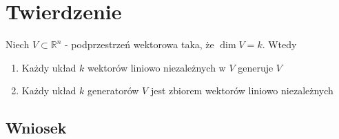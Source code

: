 \documentclass[11pt]{article}
\begin{document}
\section{Twierdzenie}
Niech $V \subset \mathbb{R}^n$ - podprzestrzeń wektorowa taka, że $\dim{V}=k$. Wtedy
\begin{enumerate}
\item{Każdy układ $k$ wektorów liniowo niezależnych w $V$ generuje $V$}
\item{Każdy układ $k$ generatorów $V$ jest zbiorem wektorów liniowo niezależnych}
\end{enumerate}

\subsection{Wniosek}
\end{document}
